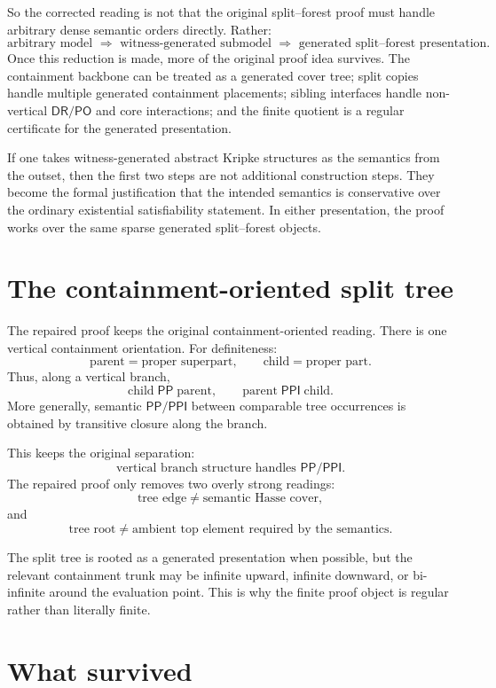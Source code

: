 \documentclass[11pt]{article}
\newcommand{\PP}{\mathsf{PP}}
\newcommand{\PPI}{\mathsf{PPI}}
\newcommand{\PO}{\mathsf{PO}}
\newcommand{\DR}{\mathsf{DR}}
\theoremstyle{definition}
\theoremstyle{plain}
\begin{document}
So the corrected reading is not that the original split--forest proof must handle arbitrary dense semantic orders directly.  Rather:
\[
\boxed{\text{arbitrary model }\Longrightarrow\text{ witness-generated submodel }\Longrightarrow\text{ generated split--forest presentation}.}
\]
Once this reduction is made, more of the original proof idea survives.  The containment backbone can be treated as a generated cover tree; split copies handle multiple generated containment placements; sibling interfaces handle non-vertical $\DR/\PO$ and core interactions; and the finite quotient is a regular certificate for the generated presentation.

If one takes witness-generated abstract Kripke structures as the semantics from the outset, then the first two steps are not additional construction steps.  They become the formal justification that the intended semantics is conservative over the ordinary existential satisfiability statement.  In either presentation, the proof works over the same sparse generated split--forest objects.

\section{The containment-oriented split tree}

The repaired proof keeps the original containment-oriented reading.  There is one vertical containment orientation.  For definiteness:
\[
\text{parent} = \text{proper superpart},
\qquad
\text{child} = \text{proper part}.
\]
Thus, along a vertical branch,
\[
\text{child} \;\PP\; \text{parent},
\qquad
\text{parent} \;\PPI\; \text{child}.
\]
More generally, semantic $\PP/\PPI$ between comparable tree occurrences is obtained by transitive closure along the branch.

This keeps the original separation:
\[
\boxed{\text{vertical branch structure handles }\PP/\PPI.}
\]
The repaired proof only removes two overly strong readings:
\[
\text{tree edge} \ne \text{semantic Hasse cover},
\]
and
\[
\text{tree root} \ne \text{ambient top element required by the semantics}.
\]

The split tree is rooted as a generated presentation when possible, but the relevant containment trunk may be infinite upward, infinite downward, or bi-infinite around the evaluation point.  This is why the finite proof object is regular rather than literally finite.

\section{What survived}
\end{document}
